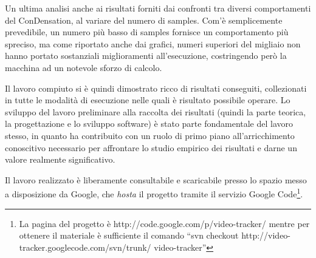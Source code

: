 Un ultima analisi anche ai risultati forniti dai confronti tra diversi comportamenti del ConDensation, al variare del numero di samples. Com'è semplicemente prevedibile, un numero più basso di samples fornisce un comportamento più spreciso, ma come riportato anche dai grafici, numeri superiori del migliaio non hanno portato sostanziali miglioramenti all'esecuzione, costringendo però la macchina ad un notevole sforzo di calcolo.

Il lavoro compiuto si è quindi dimostrato ricco di risultati conseguiti, collezionati in tutte le modalità di esecuzione nelle quali è risultato possibile operare. Lo sviluppo del lavoro preliminare alla raccolta dei risultati (quindi la parte teorica, la progettazione e lo sviluppo software) è stato parte fondamentale del lavoro stesso, in quanto ha contribuito con un ruolo di primo piano all'arricchimento conoscitivo necessario per affrontare lo studio empirico dei risultati e darne un valore realmente significativo. 

Il lavoro realizzato è liberamente consultabile e scaricabile presso lo spazio messo a disposizione da Google, che \textit{hosta} il progetto tramite il servizio Google Code\footnote{La pagina del progetto è http://code.google.com/p/video-tracker/ mentre per ottenere il materiale è sufficiente il comando ``svn checkout http://video-tracker.googlecode.com/svn/trunk/ video-tracker''}.
 



